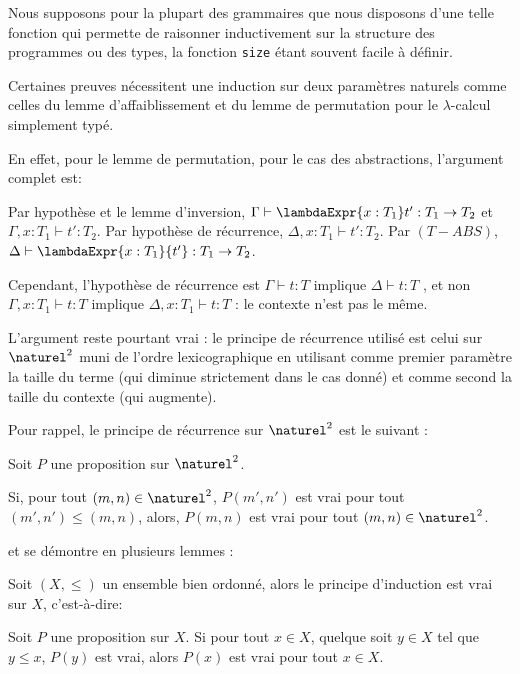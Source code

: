 Nous supposons pour la plupart des grammaires que nous disposons d'une telle
fonction qui permette de raisonner inductivement sur la structure des
programmes ou des types, la fonction \verb|size| étant souvent facile à définir.

Certaines preuves nécessitent une induction sur deux paramètres naturels comme celles
du lemme d'affaiblissement et du lemme de permutation pour le $\lambda$-calcul
simplement typé.

En effet, pour le lemme de permutation, pour le cas des abstractions, l'argument
complet est:

\og Par hypothèse et le lemme d'inversion, $\Gamma \vdash \lambdaExpr{x : T_{1}}
t' : T_{1} \rightarrow T_{2}$ et $\Gamma, x : T_{1} \vdash t' : T_{2}$. Par
hypothèse de récurrence, $\Delta, x : T_{1} \vdash t' : T_{2}$. Par $(T-ABS)$,
$\Delta \vdash \lambdaExpr{x : T_{1}}{t'} : T_{1} \rightarrow T_{2}$. \fg

Cependant, l'hypothèse de récurrence est \og $\Gamma \vdash t : T$ implique $\Delta
\vdash t : T$ \fg, et non \og $\Gamma, x : T_{1} \vdash t : T$ implique $\Delta, x :
T_{1} \vdash t : T$ \fg : le contexte n'est pas le même.

L'argument reste pourtant vrai : le principe de récurrence utilisé est celui sur
$\naturel^{2}$ muni de l'ordre lexicographique en utilisant comme premier
paramètre la taille du terme (qui diminue strictement dans le cas donné) et
comme second la taille du contexte (qui augmente).

Pour rappel, le principe de récurrence sur $\naturel^{2}$ est le suivant :
\begin{proposition}
  Soit $P$ une proposition sur $\naturel^{2}$.

  Si, pour tout $(m, n) \in \naturel^{2}$, $P(m', n')$ est vrai pour tout $(m',
  n') \leq (m, n)$, alors, $P(m, n)$ est vrai pour tout $(m, n) \in \naturel^{2}$.
\end{proposition}

et se démontre en plusieurs lemmes :

\begin{proposition} 
  Soit $(X, \leq)$ un ensemble bien ordonné, alors le principe d'induction est
  vrai sur $X$, c'est-à-dire:

  Soit $P$ une proposition sur $X$.
  Si pour tout $x \in X$, quelque soit $y \in X$ tel que $y \leq x$, $P(y)$ est
  vrai, alors $P(x)$ est vrai pour tout $x \in X$.
\end{proposition}

